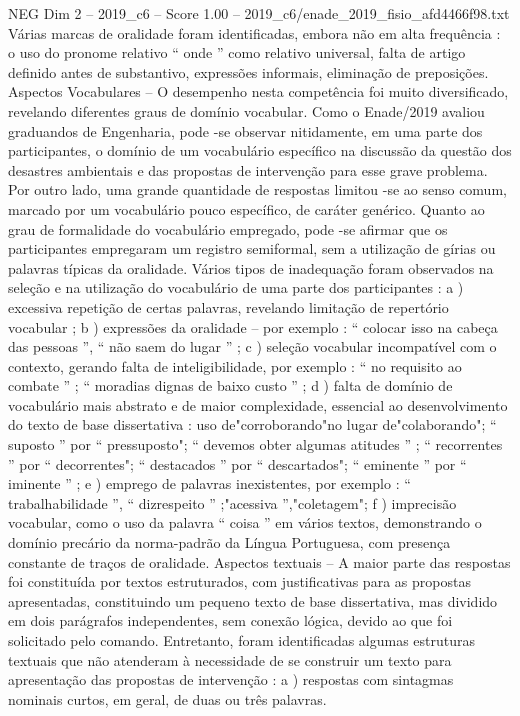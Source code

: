 \begin{textsample}{NEG Dim 2 – 2019\_c6 – Score 1.00 – 2019\_c6/enade\_2019\_fisio\_afd4466f98.txt}
Várias marcas de oralidade foram identificadas, embora não em alta frequência : o uso do pronome relativo “ onde ” como relativo universal, falta de artigo definido antes de substantivo, expressões informais, eliminação de preposições.
Aspectos Vocabulares – O desempenho nesta competência foi muito diversificado, revelando diferentes graus de domínio vocabular.
Como o Enade/2019 avaliou graduandos de Engenharia, pode -se observar nitidamente, em uma parte dos participantes, o domínio de um vocabulário específico na discussão da questão dos desastres ambientais e das propostas de intervenção para esse grave problema.
Por outro lado, uma grande quantidade de respostas limitou -se ao senso comum, marcado por um vocabulário pouco específico, de caráter genérico.
Quanto ao grau de formalidade do vocabulário empregado, pode -se afirmar que os participantes empregaram um registro semiformal, sem a utilização de gírias ou palavras típicas da oralidade.
Vários tipos de inadequação foram observados na seleção e na utilização do vocabulário de uma parte dos participantes : a ) excessiva repetição de certas palavras, revelando limitação de repertório vocabular ; b ) expressões da oralidade – por exemplo : “ colocar isso na cabeça das pessoas ”, “ não saem do lugar ” ; c ) seleção vocabular incompatível com o contexto, gerando falta de inteligibilidade, por exemplo : “ no requisito ao combate ” ; “ moradias dignas de baixo custo ” ; d ) falta de domínio de vocabulário mais abstrato e de maior complexidade, essencial ao desenvolvimento do texto de base dissertativa : uso de"corroborando"no lugar de"colaborando"; “ suposto ” por “ pressuposto"; “ devemos obter algumas atitudes ” ; “ recorrentes ” por “ decorrentes"; “ destacados ” por “ descartados"; “ eminente ” por “ iminente ” ; e ) emprego de palavras inexistentes, por exemplo : “ trabalhabilidade ”, “ dizrespeito ” ;"acessiva ”,"coletagem"; f ) imprecisão vocabular, como o uso da palavra “ coisa ” em vários textos, demonstrando o domínio precário da norma-padrão da Língua Portuguesa, com presença constante de traços de oralidade.
Aspectos textuais – A maior parte das respostas foi constituída por textos estruturados, com justificativas para as propostas apresentadas, constituindo um pequeno texto de base dissertativa, mas dividido em dois parágrafos independentes, sem conexão lógica, devido ao que foi solicitado pelo comando.
Entretanto, foram identificadas algumas estruturas textuais que não atenderam à necessidade de se construir um texto para apresentação das propostas de intervenção : a ) respostas com sintagmas nominais curtos, em geral, de duas ou três palavras.

\end{textsample}
